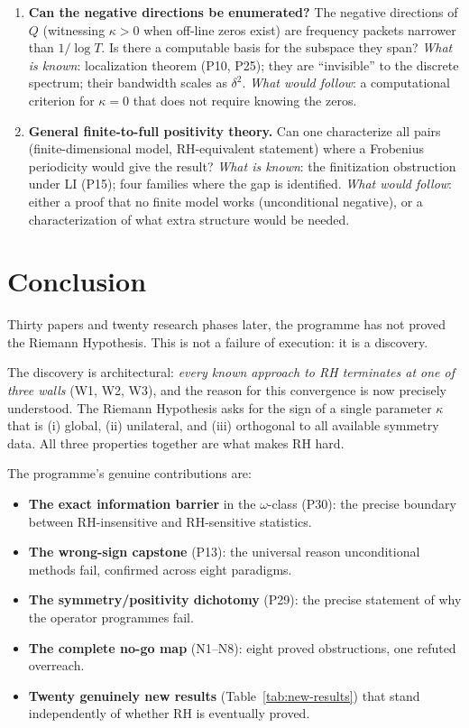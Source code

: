\documentclass[11pt]{amsart}
\theoremstyle{definition}
\theoremstyle{remark}
\newcommand{\RH}{\mathrm{RH}}
\newcommand{\om}{\omega}
\newcommand{\kap}{\kappa}
\begin{document}
\begin{enumerate}[label=\textbf{OP\arabic*.}]
\item \textbf{Can the negative directions be enumerated?}
The negative directions of $Q$ (witnessing $\kap>0$ when off-line zeros exist) are
frequency packets narrower than $1/\log T$.  Is there a computable basis for the
subspace they span?
\emph{What is known}: localization theorem (P10, P25); they are ``invisible'' to the
discrete spectrum; their bandwidth scales as $\delta^2$.
\emph{What would follow}: a computational criterion for $\kap=0$ that does not require
knowing the zeros.

\item \textbf{General finite-to-full positivity theory.}
Can one characterize all pairs (finite-dimensional model, $\RH$-equivalent statement)
where a Frobenius periodicity would give the result?
\emph{What is known}: the finitization obstruction under LI (P15); four families where
the gap is identified.
\emph{What would follow}: either a proof that no finite model works (unconditional
negative), or a characterization of what extra structure would be needed.

\end{enumerate}

\section{Conclusion}
\label{sec:conclusion}

Thirty papers and twenty research phases later, the programme has not proved the
Riemann Hypothesis.  This is not a failure of execution: it is a discovery.

The discovery is architectural: \emph{every known approach to RH terminates at one of
three walls} (W1, W2, W3), and the reason for this convergence is now precisely
understood.  The Riemann Hypothesis asks for the sign of a single parameter $\kap$ that
is (i) global, (ii) unilateral, and (iii) orthogonal to all available symmetry data.
All three properties together are what makes RH hard.

The programme's genuine contributions are:
\begin{itemize}
  \item \textbf{The exact information barrier} in the $\om$-class (P30): the precise
    boundary between RH-insensitive and RH-sensitive statistics.
  \item \textbf{The wrong-sign capstone} (P13): the universal reason unconditional
    methods fail, confirmed across eight paradigms.
  \item \textbf{The symmetry/positivity dichotomy} (P29): the precise statement of
    why the operator programmes fail.
  \item \textbf{The complete no-go map} (N1--N8): eight proved obstructions, one
    refuted overreach.
  \item \textbf{Twenty genuinely new results} (Table~\ref{tab:new-results}) that stand
    independently of whether RH is eventually proved.
\end{itemize}
\end{document}
